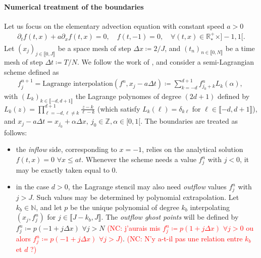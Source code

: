\documentclass{article}
\numberwithin{equation}{section}
\newcommand{\N}{\mathbb{N}}
\newcommand{\R}{\mathbb{R}}
\begin{document}
\paragraph{Numerical treatment of the boundaries}

Let us focus on the elementary advection equation with constant speed $a>0$
\begin{align*}
	\partial_t f (t,x) + a \partial_x f(t,x) = 0, \quad f(t,-1) = 0, \quad \forall (t,x) \in \R^+_* \times ]-1,1[.
\end{align*}
Let $(x_j)_{j\in\llbracket0,J\rrbracket}$ be a space mesh of step $\Delta x \coloneqq 2/J$, and $(t_n)_{n\in\llbracket 0,N \rrbracket}$ be a time mesh of step $\Delta t \coloneqq T/N$.
We follow the work of \cite{coulombelNeumannNumericalBoundary2020, boutinHighOrderNumerical2021}, and consider a semi-Lagrangian scheme defined as
\begin{align*}
	f^{n+1}_j = \text{Lagrange interpolation}\left(f^n, x_j - a \Delta t\right) \coloneqq \sum_{k=-d}^{d+1} f^n_{j_0+k} L_k (\alpha), \ 
\end{align*}
with $(L_k)_{k\in\llbracket-d,d+1\rrbracket}$ the Lagrange polynomes of degree $(2d+1)$ defined by $L_k(z)=\prod_{\ell=-d,\ell\not=k}^{d+1}\frac{z-k}{\ell-k}$
(which satisfy $L_k(\ell) = \delta_{k\ell}$ for $\ell\in \llbracket-d,d+1\rrbracket$), and $x_j - a \Delta t = x_{j_0}+\alpha \Delta x,\ j_0\in \mathbb{Z}, \alpha\in [0,1[$.
The boundaries are treated as follows:
\begin{itemize}
\item the \emph{inflow} side, corresponding to $x=-1$, relies on the analytical solution $f(t,x) = 0$ $\forall x \leqslant a t$. Whenever the scheme needs a value $f^n_j$ with $j < 0$, it may be exactly taken equal to 0.
\item in the case $d>0$, the Lagrange stencil may also need \emph{outflow} values $f^n_{j}$ with $j>J$. Such values may be determined by polynomial extrapolation. Let $k_b \in \N$, and let $p$ be the unique polynomial of degree $k_b$ interpolating $(x_j, f^n_j)$ for $j\in \llbracket J-k_b,J\rrbracket$. The \emph{outflow ghost points} will be defined by $f^n_j \coloneqq p(-1 + j \Delta x)$ $\forall j > N$ {\textcolor{red}{(NC: j'aurais mis $f^n_j \coloneqq p(1+j\Delta x)$  $\forall j>0$ ou alors $f^n_j \coloneqq p(-1+j\Delta x)$  $\forall j>J$)}}. {\textcolor{red}{(NC: N'y a-t-il pas une relation entre $k_b$ et $d$ ?)}}
\end{itemize}
\end{document}
